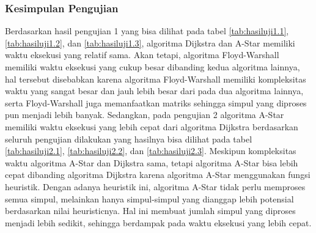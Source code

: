 \subsubsection{Kesimpulan Pengujian}
\noindent
Berdasarkan hasil pengujian 1 yang bisa dilihat pada tabel \ref{tab:hasiluji1.1}, \ref{tab:hasiluji1.2}, dan \ref{tab:hasiluji1.3}, algoritma Dijkstra dan A-Star memiliki waktu eksekusi yang relatif sama. Akan tetapi, algoritma Floyd-Warshall memiliki waktu eksekusi yang cukup besar dibanding kedua algoritma lainnya, hal tersebut disebabkan karena algoritma Floyd-Warshall memiliki kompleksitas waktu yang sangat besar dan jauh lebih besar dari pada dua algoritma lainnya, serta Floyd-Warshall juga memanfaatkan matriks sehingga simpul yang diproses pun menjadi lebih banyak. Sedangkan, pada pengujian 2 algoritma A-Star memiliki waktu eksekusi yang lebih cepat dari algoritma Dijkstra berdasarkan seluruh pengujian dilakukan yang hasilnya bisa dilihat pada tabel \ref{tab:hasiluji2.1}, \ref{tab:hasiluji2.2}, dan \ref{tab:hasiluji2.3}. Meskipun kompleksitas waktu algoritma A-Star dan Dijkstra sama, tetapi algoritma A-Star bisa lebih cepat dibanding algoritma Dijkstra karena algoritma A-Star menggunakan fungsi heuristik. Dengan adanya heuristik ini, algoritma A-Star tidak perlu memproses semua simpul, melainkan hanya simpul-simpul yang dianggap lebih potensial berdasarkan nilai heuristicnya. Hal ini membuat jumlah simpul yang diproses menjadi lebih sedikit, sehingga berdampak pada waktu eksekusi yang lebih cepat.